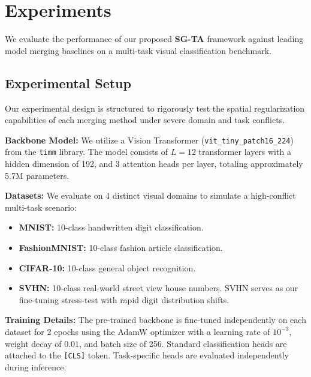 \section{Experiments}
\label{sec:experiments}

We evaluate the performance of our proposed \textbf{SG-TA} framework against leading model merging baselines on a multi-task visual classification benchmark. 

\subsection{Experimental Setup}
\label{subsec:setup}
Our experimental design is structured to rigorously test the spatial regularization capabilities of each merging method under severe domain and task conflicts.

\textbf{Backbone Model:} We utilize a Vision Transformer (\texttt{vit\_tiny\_patch16\_224}) from the \texttt{timm} library. The model consists of $L=12$ transformer layers with a hidden dimension of 192, and 3 attention heads per layer, totaling approximately 5.7M parameters.

\textbf{Datasets:} We evaluate on 4 distinct visual domains to simulate a high-conflict multi-task scenario:
\begin{itemize}
    \item \textbf{MNIST:} 10-class handwritten digit classification.
    \item \textbf{FashionMNIST:} 10-class fashion article classification.
    \item \textbf{CIFAR-10:} 10-class general object recognition.
    \item \textbf{SVHN:} 10-class real-world street view house numbers. SVHN serves as our fine-tuning stress-test with rapid digit distribution shifts.
\end{itemize}

\textbf{Training Details:} The pre-trained backbone is fine-tuned independently on each dataset for 2 epochs using the AdamW optimizer with a learning rate of $10^{-3}$, weight decay of $0.01$, and batch size of 256. Standard classification heads are attached to the \texttt{[CLS]} token. Task-specific heads are evaluated independently during inference.

